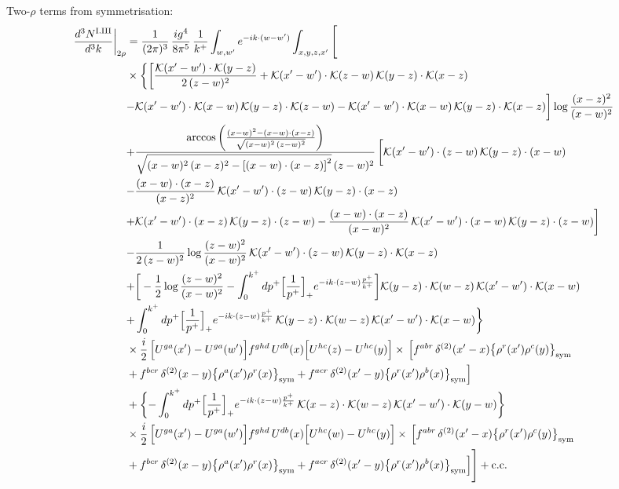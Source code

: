\documentclass[9pt]{article}
\numberwithin{equation}{section}
\begin{document}
Two-$\rho$ terms from symmetrisation:
\begin{align}
\frac{d^{3}N^{\rm I.III}}{d^{3}k}\bigg|_{2\rho} &=\frac{1}{(2\pi)^{3}}\,\frac{ig^{4}}{8\pi^{5}}\,\frac{1}{k^{+}}\int_{w,w'}e^{-ik\cdot{(w-w')}}\int_{x,y,z,x'}\Bigg[\notag\\
&\times\bigg\{{\bigg[\frac{\mathcal{K}(x'-w')\cdot\mathcal{K}(y-z)}{2\,(z-w)^{2}}+\mathcal{K}(x'-w')\cdot\mathcal{K}(z-w)\,\mathcal{K}(y-z)\cdot\mathcal{K}(x-z)}\notag\\
&{-\mathcal{K}(x'-w')\cdot\mathcal{K}(x-w)\,\mathcal{K}(y-z)\cdot\mathcal{K}(z-w)-\mathcal{K}(x'-w')\cdot\mathcal{K}(x-w)\,\mathcal{K}(y-z)\cdot\mathcal{K}(x-z)\bigg]\log\frac{(x-z)^{2}}{(x-w)^{2}}}\notag\\
&{+\frac{\arccos\left(\frac{(x-w)^{2}-(x-w)\cdot (x-z)}{\sqrt{(x-w)^{2}\,(z-w)^{2}}}\right)}{\sqrt{(x-w)^{2}\,(x-z)^{2}-\left[(x-w)\cdot (x-z)\right]^{2}}\,(z-w)^{2}}\,\bigg[\mathcal{K}(x'-w')\cdot(z-w)\,\mathcal{K}(y-z)\cdot(x-w)}\notag\\
&{-\frac{(x-w)\cdot(x-z)}{(x-z)^{2}}\,\mathcal{K}(x'-w')\cdot(z-w)\,\mathcal{K}(y-z)\cdot(x-z)}\notag\\
&{+\mathcal{K}(x'-w')\cdot(x-z)\,\mathcal{K}(y-z)\cdot(z-w)-\frac{(x-w)\cdot(x-z)}{(x-w)^{2}}\,\mathcal{K}(x'-w')\cdot(x-w)\,\mathcal{K}(y-z)\cdot(z-w)\bigg]}\notag\\
&{-\frac{1}{2\,(z-w)^{2}}\log\frac{(z-w)^{2}}{(x-w)^{2}}\,\mathcal{K}(x'-w')\cdot(z-w)\,\mathcal{K}(y-z)\cdot\mathcal{K}(x-z)}\notag\\
&{+\bigg[-\frac{1}{2}\log\frac{(z-w)^{2}}{(x-w)^{2}}-\int_{0}^{k^{+}}dp^{+}\Big[\frac{1}{p^{+}}\Big]_{+}e^{-ik\cdot{(z-w)}\frac{p^{+}}{k^{+}}}\bigg]\mathcal{K}(y-z)\cdot\mathcal{K}(w-z)\,\mathcal{K}(x'-w')\cdot\mathcal{K}(x-w)}\notag\\
&{+\int_{0}^{k^{+}}dp^{+}\Big[\frac{1}{p^{+}}\Big]_{+}e^{-ik\cdot{(z-w)}\frac{p^{+}}{k^{+}}}\,\mathcal{K}(y-z)\cdot\mathcal{K}(w-z)\,\mathcal{K}(x'-w')\cdot\mathcal{K}(x-w)}\bigg\}\notag\\
&\times \frac{i}{2}\,\Big[U^{ga}(x')-U^{ga}(w')\Big]f^{ghd}\,U^{db}(x)\Big[U^{hc}(z)-U^{hc}(y)\Big]\times\,\Big[f^{abr}\,\delta^{(2)}(x'-x)\big\{\rho^{r}(x')\rho^{c}(y)\big\}_{\rm sym}\notag\\
& +f^{bcr}\,\delta^{(2)}(x-y)\big\{\rho^{a}(x')\rho^{r}(x)\big\}_{\rm sym} +f^{acr}\,\delta^{(2)}(x'-y)\big\{\rho^{r}(x')\rho^{b}(x)\big\}_{\rm sym}\Big]\notag\\
&+\bigg\{{-\int_{0}^{k^{+}}dp^{+}\Big[\frac{1}{p^{+}}\Big]_{+}e^{-ik\cdot{(z-w)}\frac{p^{+}}{k^{+}}}\,\mathcal{K}(x-z)\cdot\mathcal{K}(w-z)\,\mathcal{K}(x'-w')\cdot\mathcal{K}(y-w)}\bigg\}\notag\\
&\times \frac{i}{2}\,\Big[U^{ga}(x')-U^{ga}(w')\Big]f^{ghd}\,U^{db}(x)\Big[U^{hc}(w)-U^{hc}(y)\Big]\times\,\Big[f^{abr}\,\delta^{(2)}(x'-x)\big\{\rho^{r}(x')\rho^{c}(y)\big\}_{\rm sym}\notag\\
& +f^{bcr}\,\delta^{(2)}(x-y)\big\{\rho^{a}(x')\rho^{r}(x)\big\}_{\rm sym} +f^{acr}\,\delta^{(2)}(x'-y)\big\{\rho^{r}(x')\rho^{b}(x)\big\}_{\rm sym}\Big]\Bigg]+{\rm c.c.}\label{eq:D-I.III-2}
\end{align}
\end{document}
